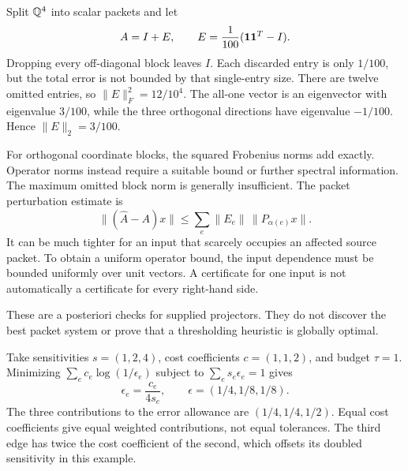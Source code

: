 Split $\mathbb Q^4$ into scalar packets and let
\[
A=I+E,\qquad E=\frac1{100}(\mathbf{1}\mathbf{1}^T-I).
\]
Dropping every off-diagonal block leaves $I$. Each discarded entry is only $1/100$, but the total error is not bounded by that single-entry size.
There are twelve omitted entries, so $\|E\|_F^2=12/10^4$. The all-one vector is an eigenvector with eigenvalue $3/100$, while the three orthogonal directions have eigenvalue $-1/100$. Hence $\|E\|_2=3/100$.

For orthogonal coordinate blocks, the squared Frobenius norms add exactly. Operator norms instead require a suitable bound or further spectral information. The maximum omitted block norm is generally insufficient.
The packet perturbation estimate is
\[
\|(\widehat A-A)x\|\le\sum_e\|E_e\|\,\|P_{\alpha(e)}x\|.
\]
It can be much tighter for an input that scarcely occupies an affected source packet. To obtain a uniform operator bound, the input dependence must be bounded uniformly over unit vectors. A certificate for one input is not automatically a certificate for every right-hand side.

These are a posteriori checks for supplied projectors. They do not discover the best packet system or prove that a thresholding heuristic is globally optimal.

Take sensitivities $s=(1,2,4)$, cost coefficients $c=(1,1,2)$, and budget $\tau=1$. Minimizing $\sum_ec_e\log(1/\epsilon_e)$ subject to $\sum_es_e\epsilon_e=1$ gives
\[
\epsilon_e=\frac{c_e}{4s_e},\qquad
\epsilon=(1/4,1/8,1/8).
\]
The three contributions to the error allowance are $(1/4,1/4,1/2)$. Equal cost coefficients give equal weighted contributions, not equal tolerances. The third edge has twice the cost coefficient of the second, which offsets its doubled sensitivity in this example.

